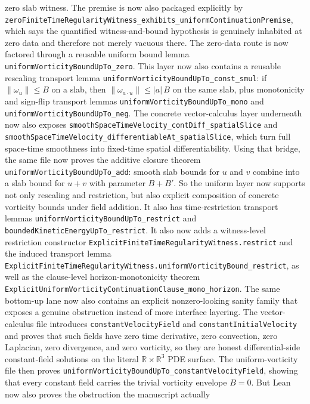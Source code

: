 \documentclass[11pt]{article}
\begin{document}
zero slab witness.  The premise is now also packaged explicitly by
\texttt{zeroFiniteTimeRegularityWitness\_exhibits\_uniformContinuationPremise},
which says the quantified witness-and-bound hypothesis is genuinely inhabited at
zero data and therefore not merely vacuous there.  The zero-data route is now
factored through a reusable uniform bound lemma
\texttt{uniformVorticityBoundUpTo\_zero}.  This layer now also contains a
reusable rescaling transport lemma
\texttt{uniformVorticityBoundUpTo\_const\_smul}: if
\(\|\omega_u\| \le B\) on a slab, then \(\|\omega_{a\cdot u}\| \le |a|\,B\) on
the same slab, plus monotonicity and sign-flip transport lemmas
\texttt{uniformVorticityBoundUpTo\_mono} and
\texttt{uniformVorticityBoundUpTo\_neg}.  The concrete vector-calculus layer
underneath now also exposes
\texttt{smoothSpaceTimeVelocity\_contDiff\_spatialSlice} and
\texttt{smoothSpaceTimeVelocity\_differentiableAt\_spatialSlice}, which turn
full space-time smoothness into fixed-time spatial differentiability.  Using
that bridge, the same file now proves the additive closure theorem
\texttt{uniformVorticityBoundUpTo\_add}: smooth slab bounds for \(u\) and \(v\)
combine into a slab bound for \(u+v\) with parameter \(B+B'\).  So the uniform
layer now supports not only rescaling and restriction, but also explicit
composition of concrete vorticity bounds under field addition.  It also has
time-restriction transport lemmas
\texttt{uniformVorticityBoundUpTo\_restrict} and
\texttt{boundedKineticEnergyUpTo\_restrict}.  It also now adds a witness-level
restriction constructor
\texttt{ExplicitFiniteTimeRegularityWitness.restrict} and the induced transport
lemma
\texttt{ExplicitFiniteTimeRegularityWitness.uniformVorticityBound\_restrict},
as well as the clause-level horizon-monotonicity theorem
\texttt{ExplicitUniformVorticityContinuationClause\_mono\_horizon}.
The same bottom-up lane now also contains an explicit nonzero-looking sanity
family that exposes a genuine obstruction instead of more interface layering.
The vector-calculus file introduces \texttt{constantVelocityField} and
\texttt{constantInitialVelocity} and proves that such fields have zero time
derivative, zero convection, zero Laplacian, zero divergence, and zero
vorticity, so they are honest differential-side constant-field solutions on the
literal \(\mathbb{R} \times \mathbb{R}^3\) PDE surface.  The uniform-vorticity
file then proves \texttt{uniformVorticityBoundUpTo\_constantVelocityField},
showing that every constant field carries the trivial vorticity envelope
\(B=0\).  But Lean now also proves the obstruction the manuscript actually
\end{document}
